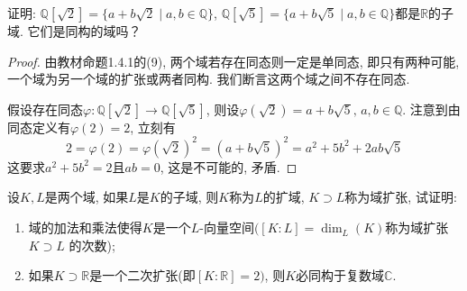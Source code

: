 \begin{problem}\label{ex:1.4.8}
    证明: $\mathbb{Q}[\sqrt 2] = \{a + b\sqrt 2 \mid a, b \in \mathbb{Q}\}$, $\mathbb{Q}[\sqrt 5] = \{a + b\sqrt 5 \mid a, b \in \mathbb{Q}\}$都是$\mathbb{R}$的子域. 它们是同构的域吗？
\end{problem}

\begin{proof}
    由教材命题1.4.1的(9), 两个域若存在同态则一定是单同态, 即只有两种可能, 一个域为另一个域的扩张或两者同构. 我们断言这两个域之间不存在同态.
    
    假设存在同态$\varphi: \mathbb{Q}[\sqrt{2}] \to \mathbb{Q}[\sqrt{5}]$, 则设$\varphi(\sqrt{2}) = a + b\sqrt{5},\, a, b \in \mathbb{Q}$. 注意到由同态定义有$\varphi(2) = 2$, 立刻有
    \[
        2 = \varphi(2) = \varphi(\sqrt{2})^2 = (a + b\sqrt{5})^2 = a^2 + 5b^2 + 2ab\sqrt{5}
    \]
    这要求$a^2 + 5b^2 = 2$且$ab = 0$, 这是不可能的, 矛盾.
\end{proof}

\begin{problem}\label{ex:1.4.9}
    设$K, L$是两个域, 如果$L$是$K$的子域, 则$K$称为$L$的扩域, $K \supset L$称为域扩张, 试证明:
    \begin{enumerate}[(1)]
        \item 域的加法和乘法使得$K$是一个$L$-向量空间$([K:L] = \dim_L(K)$称为域扩张$K \supset L$ 的次数);
        \item 如果$K \supset \mathbb{R}$是一个二次扩张(即$[K:\mathbb{R}] = 2)$, 则$K$必同构于复数域$\mathbb{C}$.
    \end{enumerate}
\end{problem}

